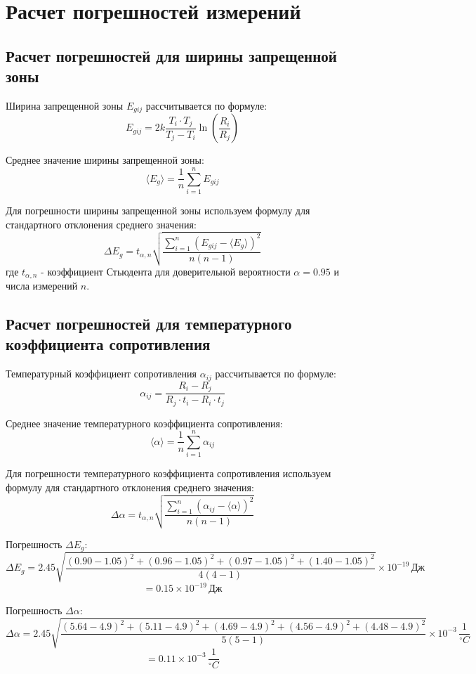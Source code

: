 \section{Расчет погрешностей измерений}

\subsection{Расчет погрешностей для ширины запрещенной зоны}

Ширина запрещенной зоны \( E_{gij} \) рассчитывается по формуле:
\[ 
E_{gij} = 2k \frac{T_i \cdot T_j}{T_j - T_i} \ln\left(\frac{R_i}{R_j}\right)
\]

Среднее значение ширины запрещенной зоны:
\[ 
\langle E_g \rangle = \frac{1}{n}\sum_{i=1}^n E_{gij}
\]

Для погрешности ширины запрещенной зоны используем формулу для стандартного отклонения среднего значения:
\[ 
\Delta E_g = t_{\alpha, n} \sqrt{\frac{\sum_{i=1}^n (E_{gij} - \langle E_g \rangle)^2}{n(n-1)}}
\]
где \( t_{\alpha, n} \) - коэффициент Стьюдента для доверительной вероятности \(\alpha = 0.95\) и числа измерений \( n \).

\subsection{Расчет погрешностей для температурного коэффициента сопротивления}

Температурный коэффициент сопротивления \( \alpha_{ij} \) рассчитывается по формуле:
\[ 
\alpha_{ij} = \frac{R_i - R_j}{R_j \cdot t_i - R_i \cdot t_j}
\]

Среднее значение температурного коэффициента сопротивления:
\[ 
\langle \alpha \rangle = \frac{1}{n} \sum_{i=1}^n \alpha_{ij}
\]

Для погрешности температурного коэффициента сопротивления используем формулу для стандартного отклонения среднего значения:
\[ 
\Delta \alpha = t_{\alpha, n} \sqrt{\frac{\sum_{i=1}^n (\alpha_{ij} - \langle \alpha \rangle)^2}{n(n-1)}}
\]

Погрешность \( \Delta E_g \):
\[ 
\Delta E_g = 2.45 \sqrt{\frac{(0.90 - 1.05)^2 + (0.96 - 1.05)^2 + (0.97 - 1.05)^2 + (1.40 - 1.05)^2 }{4(4-1)}} \times 10^{-19} \, \text{Дж}
\]
\[= 0.15 \times 10^{-19} \, \text{Дж}
\]

Погрешность \( \Delta \alpha \):
\[ 
\Delta \alpha = 2.45 \sqrt{\frac{(5.64 - 4.9)^2 + (5.11 - 4.9)^2 + (4.69 - 4.9)^2 + (4.56 - 4.9)^2 + (4.48 - 4.9)^2}{5(5-1)}} \times 10^{-3} \, \frac{1}{^\circ C} 
\]
\[
=0.11 \times 10^{-3} \, \frac{1}{^\circ C} 
\]